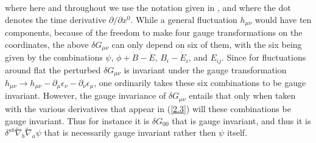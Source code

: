 %
where here and throughout we use the notation given in \cite{weinberg_1972}, and where the dot denotes the time derivative $\partial/\partial x^0$. While a general fluctuation $h_{\mu\nu}$ would have ten components, because of the freedom to make four gauge transformations on the coordinates, the above $\delta G_{\mu\nu}$ can only depend on six of them, with the six being given by the combinations $\psi$, $\phi+\dot{B}  -\ddot{E}$, $B_{i} -  \dot{E}_{i}$, and $E_{ij}$. Since for fluctuations around flat the perturbed $\delta G_{\mu\nu}$ is invariant under the gauge transformation $h_{\mu\nu}\rightarrow h_{\mu\nu}-\partial_{\mu}\epsilon_{\nu}-\partial_{\nu}\epsilon_{\mu}$, one ordinarily takes these six combinations to be gauge invariant. However, the gauge invariance of $\delta G_{\mu\nu}$ entails that only when taken with the various derivatives that appear in (\ref{2.3}) will these combinations be gauge invariant. Thus for instance it is $\delta G_{00}$ that is gauge invariant, and thus it is $\delta^{ab} \tilde{\nabla}_{b}\tilde{\nabla}_{a}\psi$ that is necessarily gauge invariant rather then $\psi$ itself. 


